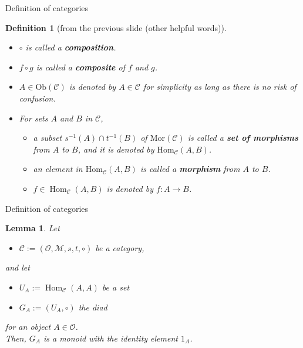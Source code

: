 \documentclass[dvipdfmx,10pt,notheorems]{beamer}
\newtheorem{definition}[theorem]{Definition}
\newtheorem{lemma}[theorem]{Lemma}
\renewcommand{\#}{^\sharp}
\DeclareMathOperator{\Hom}{Hom}
\begin{document}
	\begin{frame}{Definition of categories}
			\begin{definition}[from the previous slide (other helpful words)]
					\begin{itemize}
							\item $\circ$ is called a {\bf composition}.
							\item  $f\circ g$ is called a {\bf composite} of $f$ and $g$.
							\item 
							$A\in \mathrm{Ob}(\mathcal{C})$ is denoted by $A \in \mathcal{C}$ for simplicity
							as long as there is no risk of confusion.
							\item	For sets $A$ and $B$ in $\mathcal{C}$,
									\begin{itemize}
											\item a subset $s^{-1}(A) \cap t^{-1}(B)$ of $\mathrm{Mor}(\mathcal{C})$
											is called a {\bf set of
											morphisms} from $A$ to $B$, and it
											is denoted by $\mathrm{Hom}_{\mathcal{C}}(A,B)$.
											\item an element in $\mathrm{Hom}_{\mathcal{C}}(A,B)$
											is called a {\bf morphism} from $A$ to $B$.
											\item $f\in\Hom_{\mathcal{C}}(A,B)$ is denoted by $f:A\rightarrow B$.
									\end{itemize}
					\end{itemize}
			\end{definition}
	\end{frame}
	
	
	
	\begin{frame}{Definition of categories}
			\begin{lemma}
					Let
							\begin{itemize}
									\item $\mathcal{C}:=(\mathcal{O}, \mathcal{M}, s,t,\circ)$ be a category,
							\end{itemize}
					and let
							\begin{itemize}
									\item $U_A:=\Hom_{\mathcal{C}}(A,A)$ be a set
									\item $G_A:=(U_A, \circ)$ the diad
							\end{itemize}
					 for an object $A\in\mathcal{O}$.\\
					Then,
					$G_A$ is a monoid with the identity element $1_A$.
			\end{lemma}
	\end{frame}
	
\end{document}
